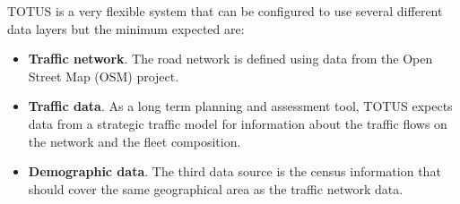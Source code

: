
TOTUS is a very flexible system that can be configured to use several different data layers but the minimum expected are:
\begin{itemize}
	\item \textbf{Traffic network}. The road network is defined using data from the Open Street Map (OSM) project\cite{dummy_temp}.
	\item \textbf{Traffic data}. As a long term planning and assessment tool, TOTUS expects data from a strategic traffic model for information about the traffic flows on the network and the fleet composition.
	\item \textbf{Demographic data}. The third data source is the census information that should cover the same geographical area as the traffic network data.
\end{itemize}


